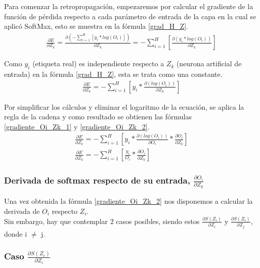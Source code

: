 Para comenzar la retropropagación, empezaremos por calcular el gradiente de la función de pérdida respecto a cada parámetro de entrada de la capa en la cual se aplicó SoftMax, esto se muestra en la fórmula \ref{grad_H_Z}.
\begin{gather}
	\frac{\partial E}{\partial Z_k} = \frac{\partial(- \sum_{i=1}^{H}  [y_i * log(O_i)])}{\partial Z_k} = - \sum_{i=1}^{H}  [\frac{\partial(y_i * log(O_i))}{\partial Z_k}] 
	\label{grad_H_Z}
\end{gather}

Como $y_i$ (etiqueta real) es independiente respecto a $Z_k$ (neurona artificial de entrada) en la fórmula \ref{grad_H_Z}, esta se trata como una constante. \\
\begin{gather}
	\frac{\partial E}{\partial Z_k} = - \sum_{i=1}^{H}  [y_i * \frac{\partial(log(O_i))}{\partial Z_k}] 
	\label{grad_O_K}
\end{gather}

Por simplificar los cálculos y eliminar el logaritmo de la ecuación, se aplica la regla de la cadena y como resultado se obtienen las fórmulas \ref{gradiente_Oi_Zk_1} y \ref{gradiente_Oi_Zk_2}.
\begin{gather}	
	\frac{\partial E}{\partial Z_k} = - \sum_{i=1}^{H}  [y_i * \frac{\partial(log(O_i))}{\partial O_i} * \frac{\partial O_i}{\partial Z_k}]
	\label{gradiente_Oi_Zk_1} \\
	\frac{\partial E}{\partial Z_k} = - \sum_{i=1}^{H}  [\frac{y_i}{O_i} * \frac{\partial O_i}{\partial Z_k}] 
	\label{gradiente_Oi_Zk_2}
\end{gather}


\subsubsection{Derivada de softmax respecto de su entrada, $\frac{\partial O_i}{\partial Z_k}$}

Una vez obtenida la fórmula \ref{gradiente_Oi_Zk_2} nos disponemos a calcular la derivada de $O_i$ respecto $Z_i$. \\
Sin embargo, hay que contemplar 2 casos posibles, siendo estos $\frac{\partial S(Z_i)}{\partial Z_i}$ y $\frac{\partial S(Z_i)}{\partial Z_j}$, donde i $\neq$ j. \\

\subsubsection{Caso $\frac{\partial S(Z_i)}{\partial Z_i}$}

